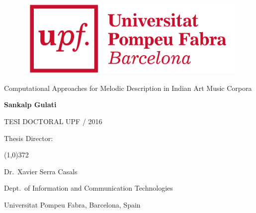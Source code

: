
\newpage
\thispagestyle{empty}
\begin{titlingpage}
\begin{flushright}

  \begin{figure}[t]
    \begin{flushright}
	\includegraphics[scale=0.08]{ch00/figures/logo_upf_color.png}
    \end{flushright}
  \end{figure}

  \vspace*{3cm} 

  {\huge {Computational Approaches for Melodic Description in Indian Art Music Corpora}}
  
  \vspace*{3cm}

  \textbf{\large {Sankalp Gulati}}
  
  \vspace*{\fill} 
  TESI DOCTORAL UPF / 2016

\end{flushright}
  
  \vspace*{2cm}

  Thesis Director:

  \vspace*{-0.25cm}

  \line(1,0){372}
  
  \vspace*{0.25cm}

  Dr.~Xavier Serra Casals

  Dept.~of Information and Communication Technologies

  Universitat Pompeu Fabra, Barcelona, Spain
  
\end{titlingpage}

